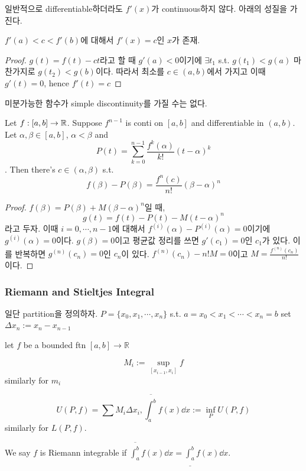 \documentclass{article}
\begin{document}
일반적으로 differentiable하더라도 $f'(x)$가 continuous하지 않다. 아래의 성질을 가진다.

\begin{theorem}
    $f'(a)<c<f'(b)$에 대해서 $f'(x)=c$인 $x$가 존재.
\end{theorem}
\begin{proof}
    $g(t)=f(t)-ct$라고 할 때 $g'(a) < 0$이기에 $\exists t_1$ s.t. $g(t_1) < g(a)$ 마찬가지로 $g(t_2) < g(b)$이다. 따라서 최소를 $c \in (a,b)$에서 가지고 이때 $g'(t)=0$, hence $f'(t)=c$
\end{proof}

\begin{corollary}
    미분가능한 함수가 simple discontinuity를 가질 수는 없다.
\end{corollary}

\begin{theorem}
    \label{theorem:taylor}
    Let $f:[a,b] \to \mathbb{R}$. Suppose $f^{n-1}$ is conti on $[a,b]$ and differentiable in $(a,b)$. Let $\alpha, \beta \in [a,b]$, $\alpha < \beta$ and
    \[
    P(t)=\sum_{k=0}^{n-1} \frac{f^{k}(\alpha)}{k!}(t-\alpha)^k
    \]. Then there's $c \in (\alpha, \beta)$ s.t. \[f(\beta)-P(\beta)=\frac{f^n(c)}{n!}(\beta-\alpha)^n\]
\end{theorem}

\begin{proof}
    $f(\beta)=P(\beta)+M(\beta-\alpha)^n$일 때, \[g(t)=f(t)-P(t)-M(t-\alpha)^n\]라고 두자. 이때 $i=0,\cdots,n-1$에 대해서 $f^{(i)}(\alpha)-P^{(i)}(\alpha)=0$이기에 $g^{(i)}(\alpha)=0$이다. $g(\beta)=0$이고 평균값 정리를 쓰면 $g'(c_1)=0$인 $c_1$가 있다. 이를 반복하면 $g^{(n)}(c_n)=0$인 $c_n$이 있다. $f^{(n)}(c_n)-n!M=0$이고 $M=\frac{f^{(n)}(c_n)}{n!}$이다. 
\end{proof}

\subsubsection{Riemann and Stieltjes Integral}

일단 partition을 정의하자. $P=\{x_0, x_1, \cdots, x_n\}$ s.t. $a=x_0 < x_1 < \cdots < x_n=b$ 
set $\Delta x_n := x_n - x_{n-1}$ 

let $f$ be a bounded ftn $[a,b] \to \mathbb{R}$

\[
M_i := \sup_{[x_{i-1}, x_i]} f
\]
similarly for $m_i$

\[
U(P, f)=\sum M_i \Delta x_i, \overline{\int^b_a}f(x)\dd x := \inf_P U(P,f)
\]
similarly for $L(P, f)$.

\begin{definition}
    We say $f$ is Riemann integrable if $\overline{\int^b_a} f(x)\dd x = \underline{\int^b_a} f(x)\dd x$.
\end{definition}
\end{document}
